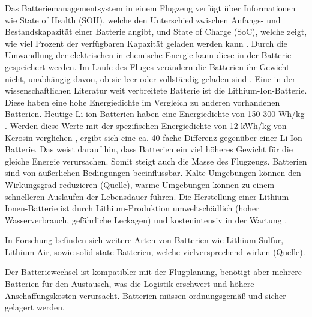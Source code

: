 Das Batteriemanagementsystem in einem Flugzeug verfügt über Informationen wie State of Health (SOH), welche den Unterschied zwischen Anfangs-
und Bestandskapazität einer Batterie angibt, und State of Charge (SoC), welche zeigt, wie viel Prozent der verfügbaren Kapazität geladen werden kann \cite{donckers2024electric}.
Durch die Umwandlung der elektrischen in chemische Energie kann diese in der Batterie gespeichert werden.
Im Laufe des Fluges verändern die Batterien ihr Gewicht nicht, unabhängig davon, ob sie leer oder vollständig geladen sind \cite{donckers2024electric}. 
Eine in der wissenschaftlichen Literatur weit verbreitete Batterie ist die Lithium-Ion-Batterie. Diese haben eine hohe Energiedichte im Vergleich zu anderen vorhandenen Batterien. %
Heutige Li-ion Batterien haben eine Energiedichte von 150-300 Wh/kg \cite{colpan2022fuel}. Werden diese Werte mit der spezifischen Energiedichte von 12 kWh/kg von Kerosin verglichen \cite{dalmia2022powering},
ergibt sich eine ca. 40-fache Differenz gegenüber einer Li-Ion-Batterie. Das weist darauf hin, dass Batterien ein viel höheres Gewicht für die gleiche Energie verursachen. 
Somit steigt auch die Masse des Flugzeugs.
Batterien sind von äußerlichen Bedingungen beeinflussbar. Kalte Umgebungen können 
den Wirkungsgrad reduzieren (Quelle), warme Umgebungen können zu einem schnelleren Auslaufen der Lebensdauer führen. 
Die Herstellung einer Lithium-Ionen-Batterie ist durch Lithium-Produktion umweltschädlich (hoher Wasserverbrauch, gefährliche Leckagen) und 
kostenintensiv in der Wartung \cite{dalmia2022powering}. 


In Forschung befinden sich weitere Arten von Batterien wie Lithium-Sulfur, Lithium-Air, sowie solid-state Batterien, welche vielversprechend wirken (Quelle).
%
%

Der Batteriewechsel ist kompatibler mit der Flugplanung, benötigt aber mehrere Batterien für den Austausch, was die Logistik erschwert 
und höhere Anschaffungskosten verursacht. Batterien müssen ordnungsgemäß und sicher gelagert werden. \cite{salucci2020optimal}


